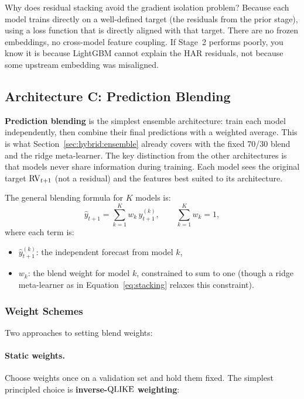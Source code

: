 Why does residual stacking avoid the gradient isolation problem?
Because each model trains directly on a well-defined target (the
residuals from the prior stage), using a loss function that is directly
aligned with that target.  There are no frozen embeddings, no
cross-model feature coupling.  If Stage~2 performs poorly, you know it
is because LightGBM cannot explain the HAR residuals, not because some
upstream embedding was misaligned.


\subsection{Architecture C: Prediction Blending}
\label{sec:hybrid:pred-blend}

\textbf{Prediction blending} is the simplest ensemble architecture:
train each model independently, then combine their final predictions
with a weighted average.  This is what
Section~\ref{sec:hybrid:ensemble} already covers with the fixed 70/30
blend and the ridge meta-learner.  The key distinction from the other
architectures is that models never share information during training.
Each model sees the original target $\operatorname{RV}_{t+1}$ (not a residual) and
the features best suited to its architecture.

The general blending formula for $K$ models is:
\begin{equation}\label{eq:pred-blend-general}
  \hat{y}_{t+1} = \sum_{k=1}^{K} w_k\,\hat{y}_{t+1}^{(k)},
  \qquad \sum_{k=1}^{K} w_k = 1,
\end{equation}
where each term is:
\begin{itemize}
  \item $\hat{y}_{t+1}^{(k)}$: the independent forecast from model $k$,
  \item $w_k$: the blend weight for model $k$, constrained to sum
        to one (though a ridge meta-learner as in
        Equation~\eqref{eq:stacking} relaxes this constraint).
\end{itemize}

\subsubsection{Weight Schemes}

Two approaches to setting blend weights:

\paragraph{Static weights.}
Choose weights once on a validation set and hold them fixed.  The
simplest principled choice is \textbf{inverse-$\operatorname{QLIKE}$ weighting}:

